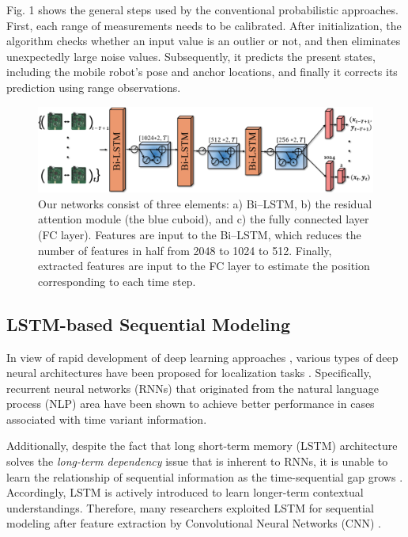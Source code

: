 \documentclass[letterpaper, 10 pt, conference]{ieeeconf}
\begin{document}
Fig. 1 shows the general steps used by the conventional probabilistic approaches. First, each range of measurements needs to be calibrated. After initialization, the algorithm checks whether an input value is an outlier or not, and then eliminates unexpectedly large noise values. Subsequently, it predicts the present states, including the mobile robot's pose and anchor locations, and finally it corrects its prediction using range observations.

 \begin{figure}[h]
	\centering
	\includegraphics[width=0.95\linewidth]{image/network_figure}
	\caption{Our networks consist of three elements: a) Bi--LSTM, b) the residual attention module (the blue cuboid), and c) the fully connected layer (FC layer). Features are input to the Bi--LSTM, which reduces the number of features in half from 2048 to 1024 to 512. Finally, extracted features are input to the FC layer to estimate the position corresponding to each time step.}
	\label{fig:our_network} 	
\end{figure}

\subsection{LSTM-based Sequential Modeling}

In view of rapid development of deep learning approaches \cite{lecun2015deep}, various types of deep neural architectures have been proposed for localization tasks \cite{kendall2016modelling, kendall2015posenet, gladh2016deep}. Specifically, recurrent neural networks (RNNs) that originated from the natural language process (NLP) area \cite{elman1990finding} have been shown to achieve better performance in cases associated with time variant information. 

Additionally, despite the fact that long short-term memory (LSTM) architecture solves the \textit{long-term dependency} issue that is inherent to RNNs, it is unable to learn the relationship of sequential information as the time-sequential gap grows \cite{hochreiter1997long}. Accordingly, LSTM is actively introduced to learn longer-term contextual understandings. Therefore, many researchers exploited LSTM for sequential modeling after feature extraction by Convolutional Neural Networks (CNN) \cite{clark2017vinet,patel2018contextualnet, wang2017deepvo}. 
\end{document}
